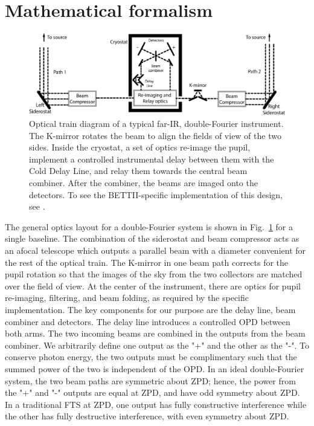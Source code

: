 \section{Mathematical formalism}
\label{sec:formalism}

\begin{figure}[ht!]
\begin{center}
\includegraphics[width=\textwidth]{Figures/f2.eps}
\caption[Optics layout of Double-Fourier interferometers]{Optical train diagram of a typical far-IR, double-Fourier instrument. The K-mirror rotates the beam to align the fields of view of the two sides. Inside the cryostat, a set of optics re-image the pupil, implement a controlled instrumental delay between them with the Cold Delay Line, and relay them towards the central beam combiner. After the combiner, the beams are imaged onto the detectors. To see the BETTII-specific implementation of this design, see \citet{Rinehart:2014gk}.}
\label{fig:optics}
\end{center}
\end{figure}

The general optics layout for a double-Fourier system is shown in Fig.~\ref{fig:optics} for a single baseline. 
The combination of the siderostat and beam compressor acts as an afocal telescope 
which outputs a  parallel beam with a diameter convenient for the rest of the optical train.
The K-mirror in one beam path corrects for the pupil rotation so that the
images of the sky from the two collectors are matched over the field of view.
At the center of the instrument, there are optics for pupil re-imaging, filtering, and beam folding, as required by the specific implementation.
The key components for our purpose are the delay line, beam combiner and detectors. 
The delay line introduces a controlled OPD between both arms.
The two incoming beams are combined in the outputs from the beam combiner. 
We arbitrarily define one output as the "+" and the other as the \mbox{"-"}. 
To conserve photon energy, the two outputs must be complimentary such that the summed power of the two is
independent of the OPD. In an ideal double-Fourier system, the two beam paths are symmetric about ZPD; 
hence, the power 
from the "+" and "-" outputs are equal at ZPD, and have odd symmetry about ZPD. In a traditional FTS at ZPD, one output has fully constructive interference while the other has fully destructive interference, with even symmetry about ZPD.

